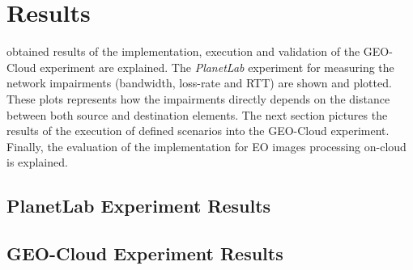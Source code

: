 \chapter{Results}
\label{chap:results}

 obtained results of the implementation, execution and
validation of the GEO-Cloud experiment are explained. The \emph{PlanetLab}
experiment for measuring the network impairments (bandwidth, loss-rate and
\ac{RTT}) are shown and plotted. These plots represents how the impairments
directly depends on the distance between both source and destination elements.
The next section pictures the results of the execution of defined scenarios into
the GEO-Cloud experiment. Finally, the evaluation of the implementation for
\ac{EO} images processing on-cloud is explained.

\section{PlanetLab Experiment Results}

\section{GEO-Cloud Experiment Results}
